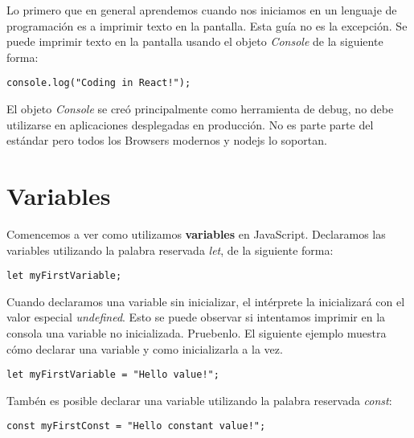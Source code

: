 \documentclass[a4paper, oneside, titlepage, 12pt]{paper}
\begin{document}
Lo primero que en general aprendemos cuando nos iniciamos en un lenguaje de programación es a imprimir texto en la pantalla. Esta guía no es la excepción. Se puede imprimir texto en la pantalla usando el objeto \textit{Console} de la siguiente forma:

\begin{verbatim}
console.log("Coding in React!");
\end{verbatim}

El objeto \textit{Console} se creó principalmente como herramienta de debug, no debe utilizarse en aplicaciones desplegadas en producción. No es parte parte del estándar pero todos los Browsers modernos y \textsf{nodejs} lo soportan.
\newline

\section{Variables}

Comencemos a ver como utilizamos \textbf{variables} en JavaScript. Declaramos las variables utilizando la palabra reservada \textit{let}, de la siguiente forma:

\begin{verbatim}
let myFirstVariable;
\end{verbatim}

Cuando declaramos una variable sin inicializar, el intérprete la inicializará con el valor especial \textit{undefined}. Esto se puede observar si intentamos imprimir en la consola una variable no inicializada. Pruebenlo. El siguiente ejemplo muestra cómo declarar una variable y como inicializarla a la vez.

\begin{verbatim}
let myFirstVariable = "Hello value!";
\end{verbatim}

Tambén es posible declarar una variable utilizando la palabra reservada \textit{const}:

\begin{verbatim}
const myFirstConst = "Hello constant value!";
\end{verbatim}
\end{document}
